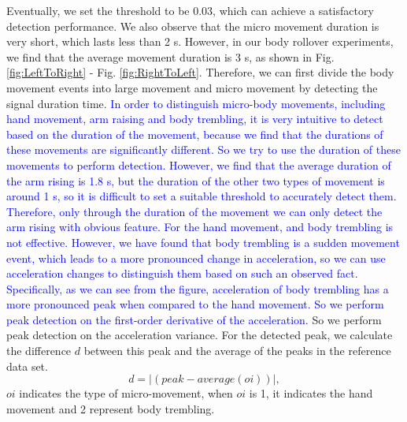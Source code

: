 Eventually, we set the threshold to be 0.03, which can achieve a satisfactory detection performance. We also observe that the micro movement duration is very short, which lasts less than 2 s. However, in our body rollover experiments, we find that the average movement duration is 3 s, as shown in Fig. \ref{fig:LeftToRight} - Fig. \ref{fig:RightToLeft}. Therefore, we can first divide the body movement events into large movement and micro movement by detecting the signal duration time. \textcolor{blue}{In order to distinguish micro-body movements, including hand movement, arm raising and body trembling, it is very intuitive to detect based on the duration of the movement, because we find that the durations of these movements are significantly different. So we try to use the duration of these movements to perform detection. However, we find that the average duration of the arm rising is 1.8 s, but the duration of the other two types of movement is around 1 s, so it is difficult to set a suitable threshold to accurately detect them. Therefore, only through the duration of the movement we can only detect the arm rising with obvious feature. For the hand movement, and body trembling is not effective. However, we have found that body  trembling is a sudden movement event, which leads to a more pronounced change in acceleration, so we can use acceleration changes to distinguish them based on such an observed fact. Specifically,  as we can see from the figure,  acceleration of body trembling has a more pronounced peak when compared to the hand movement. So we perform peak detection on the first-order derivative of the acceleration.} So we perform peak detection on the acceleration variance. For the detected peak, we calculate the difference $d$ between this peak and the average of the peaks in the reference data set. %
\begin{equation}
      d=\mid(peak-average(oi))\mid,
\end{equation}
$oi$ indicates the type of micro-movement, when $oi$ is 1, it indicates the hand movement and 2 represent body trembling.


